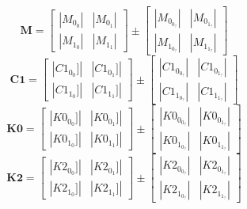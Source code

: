 \documentclass[landscape]{article}
\begin{document}
\begin{equation}
\mathbf{M}=
\left[
\begin{array}{rr}
    |M_0_0| & |M_0_1|\\
    |M_1_0| & |M_1_1|
\end{array}
\right]
\pm
\left[
\begin{array}{rr}
    |M_0_0_?| & |M_0_1_?|\\
    |M_1_0_?| & |M_1_1_?|
\end{array}
\right]
\label{eq:M}
\end{equation}
\begin{equation}
\mathbf{C1}=
\left[
\begin{array}{rr}
    |C1_0_0]| & |C1_0_1]|\\
    |C1_1_0]| & |C1_1_1]|
\end{array}
\right]
\pm
\left[
\begin{array}{rr}
    |C1_0_0_?| & |C1_0_1_?|\\
    |C1_1_0_?| & |C1_1_1_?|
\end{array}
\right]
\label{eq:C1}
\end{equation}
\begin{equation}
\mathbf{K0}=
\left[
\begin{array}{rr}
    |K0_0_0]| & |K0_0_1]|\\
    |K0_1_0]| & |K0_1_1]|
\end{array}
\right]
\pm
\left[
\begin{array}{rr}
    |K0_0_0_?| & |K0_0_1_?|\\
    |K0_1_0_?| & |K0_1_1_?|
\end{array}
\right]
\label{eq:K0}
\end{equation}
\begin{equation}
\mathbf{K2}=
\left[
\begin{array}{rr}
    |K2_0_0]| & |K2_0_1]|\\
    |K2_1_0]| & |K2_1_1]|
\end{array}
\right]
\pm
\left[
\begin{array}{rr}
    |K2_0_0_?| & |K2_0_1_?|\\
    |K2_1_0_?| & |K2_1_1_?|
\end{array}
\right]
\label{eq:K2}
\end{equation}
\end{document}
